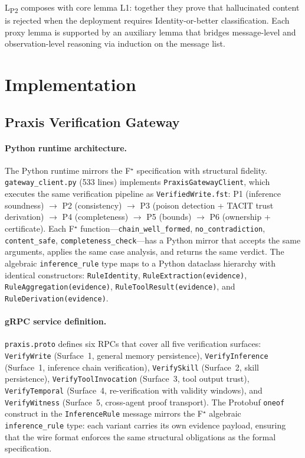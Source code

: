 \documentclass[sigplan,screen,nonacm]{acmart}
\newcommand{\fstar}{F\ensuremath{^\star}}
\begin{document}
L\textsubscript{P2} composes with core lemma L1: together they prove that
hallucinated content is rejected when the deployment requires Identity-or-better
classification. Each proxy lemma is supported by an auxiliary lemma that
bridges message-level and observation-level reasoning via induction on the
message list.


\section{Implementation}
\label{sec:implementation}

\subsection{Praxis Verification Gateway}

\paragraph{Python runtime architecture.}
The Python runtime mirrors the \fstar{} specification with structural
fidelity. \texttt{gateway\_client.py} (533 lines) implements
\texttt{PraxisGatewayClient}, which executes the same verification pipeline
as \texttt{VerifiedWrite.fst}: P1 (inference soundness) $\to$ P2
(consistency) $\to$ P3 (poison detection + TACIT trust derivation) $\to$
P4 (completeness) $\to$ P5 (bounds) $\to$ P6 (ownership + certificate).
Each \fstar{} function---\texttt{chain\_well\_formed},
\texttt{no\_contradiction}, \texttt{content\_safe},
\texttt{completeness\_check}---has a Python mirror that accepts the same
arguments, applies the same case analysis, and returns the same verdict. The
algebraic \texttt{inference\_rule} type maps to a Python dataclass hierarchy
with identical constructors: \texttt{RuleIdentity},
\texttt{RuleExtraction(evidence)}, \texttt{RuleAggregation(evidence)},
\texttt{RuleToolResult(evidence)}, and \texttt{RuleDerivation(evidence)}.

\paragraph{gRPC service definition.}
\texttt{praxis.proto} defines six RPCs that cover all five verification
surfaces: \texttt{VerifyWrite} (Surface~1, general memory persistence),
\texttt{VerifyInference} (Surface~1, inference chain verification),
\texttt{VerifySkill} (Surface~2, skill persistence),
\texttt{VerifyToolInvocation} (Surface~3, tool output trust),
\texttt{VerifyTemporal} (Surface~4, re-verification with validity windows),
and \texttt{VerifyWitness} (Surface~5, cross-agent proof transport). The
Protobuf \texttt{oneof} construct in the \texttt{InferenceRule} message
mirrors the \fstar{} algebraic \texttt{inference\_rule} type: each variant
carries its own evidence payload, ensuring that the wire format enforces the
same structural obligations as the formal specification.
\end{document}

